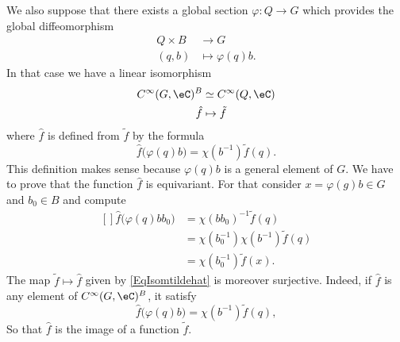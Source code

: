 We also suppose that there exists a global section $\varphi\colon Q\to G$ which provides the global diffeomorphism
\begin{equation}
	\begin{aligned}
		Q\times B&\to G \\
		(q,b)&\mapsto \varphi(q)b.
	\end{aligned}
\end{equation}
In that case we have a linear isomorphism
\begin{equation}		\label{EqIsomTildeHat}
	\begin{aligned}
		C^{\infty}(G,\eC)^B&\simeq  C^{\infty}(Q,\eC) \\
		\hat f&\mapsto \tilde f
	\end{aligned}
\end{equation}
where $\hat f$ is defined from $\tilde f$ by the formula
\begin{equation}		\label{EqIsomtildehat}
	\hat f\big( \varphi(q)b \big)=\chi(b^{-1})\tilde f(q).
\end{equation}
This definition makes sense because $\varphi(q)b$ is a general element of $G$. We have to prove that the function $\hat f$ is equivariant. For that consider $x=\varphi(g)b\in G$ and $b_0\in B$ and compute
\begin{equation}
	\begin{aligned}[]
		\hat f\big( \varphi(q)bb_0 \big)&=\chi(bb_0)^{-1}\tilde f(q)\\
		&=\chi(b_0^{-1})\chi(b^{-1})\tilde f(q)\\
		&=\chi(b_0^{-1})\tilde f(x).
	\end{aligned}
\end{equation}
The map $\tilde f\mapsto\hat f$ given by \eqref{EqIsomtildehat} is moreover surjective. Indeed, if $\hat f$ is any element of $ C^{\infty}(G,\eC)^B$, it satisfy
\begin{equation}
	\hat f\big( \varphi(q)b \big)=\chi(b^{-1})\tilde f(q),
\end{equation}
So that $\hat f$ is the image of a function $\tilde f$.

